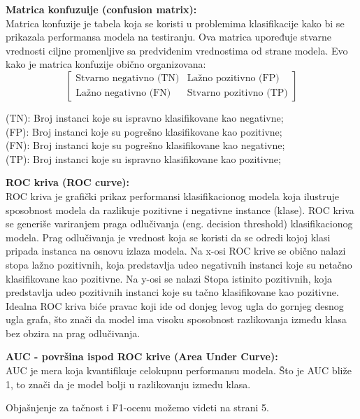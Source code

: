 \documentclass{article}
\begin{document}
\begin{flushleft}
\textbf{Matrica konfuzuije (confusion matrix):} \\
Matrica konfuzije je tabela koja se koristi u problemima klasifikacije kako bi se prikazala performansa modela na testiranju. Ova matrica upoređuje stvarne vrednosti ciljne promenljive sa predviđenim vrednostima od strane modela. Evo kako je matrica konfuzije obično organizovana: \\
\[
\begin{bmatrix}
\text{Stvarno negativno (TN)} & \text{Lažno pozitivno (FP)} \\
\text{Lažno negativno (FN)} & \text{Stvarno pozitivno (TP)}
\end{bmatrix}
\]
\begin{center}
(TN): Broj instanci koje su ispravno klasifikovane kao negativne;\\
(FP): Broj instanci koje su pogrešno klasifikovane kao pozitivne;\\
(FN): Broj instanci koje su pogrešno klasifikovane kao negativne;\\
(TP): Broj instanci koje su ispravno klasifikovane kao pozitivne;\\
    
\end{center}


\vspace{2.75mm}

\textbf{ROC kriva (ROC curve):}\\
ROC kriva je grafički prikaz performansi klasifikacionog modela koja ilustruje sposobnost modela da razlikuje pozitivne i negativne instance (klase). ROC kriva se generiše variranjem praga odlučivanja (eng. decision threshold) klasifikacionog modela. Prag odlučivanja je vrednost koja se koristi da se odredi kojoj klasi pripada instanca na osnovu izlaza modela. Na x-osi ROC krive se obično nalazi stopa lažno pozitivnih, koja predstavlja udeo negativnih instanci koje su netačno klasifikovane kao pozitivne. Na y-osi se nalazi Stopa istinito pozitivnih, koja predstavlja udeo pozitivnih instanci koje su tačno klasifikovane kao pozitivne. Idealna ROC kriva biće pravac koji ide od donjeg levog ugla do gornjeg desnog ugla grafa, što znači da model ima visoku sposobnost razlikovanja između klasa bez obzira na prag odlučivanja.
\vspace{2.75mm}

\textbf{AUC - površina ispod ROC krive (Area Under Curve):} \\
AUC je mera koja kvantifikuje celokupnu performansu modela. Što je AUC bliže 1, to znači da je model bolji u razlikovanju između klasa. 
\vspace{2.75mm}

Objašnjenje za tačnost i F1-ocenu možemo videti na strani 5.


\end{flushleft}
\end{document}

